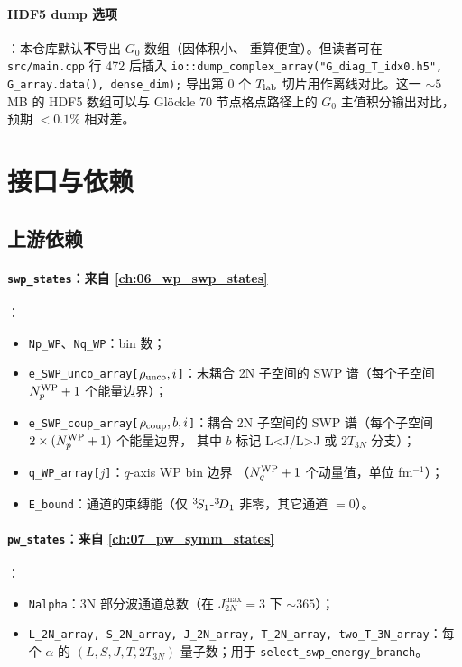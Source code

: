 \paragraph{HDF5 dump 选项}：本仓库默认\textbf{不}导出 \(G_0\) 数组（因体积小、
重算便宜）。但读者可在 \texttt{src/main.cpp} 行 472 后插入
\texttt{io::dump\_complex\_array("G\_diag\_T\_idx0.h5", G\_array.data(),
dense\_dim);} 导出第 0 个 \(T_{\rm lab}\) 切片用作离线对比。这一 \(\sim 5\) MB
的 HDF5 数组可以与 Glöckle 70 节点格点路径上的 \(G_0\) 主值积分输出对比，
预期 \(< 0.1\%\) 相对差。

\section{接口与依赖}
\label{sec:ch10-interface}

\subsection{上游依赖}
\label{subsec:ch10-upstream}

\paragraph{\texttt{swp\_states}：来自 \cref{ch:06_wp_swp_states}}：
\begin{itemize}
  \item \texttt{Np\_WP}、\texttt{Nq\_WP}：bin 数；
  \item \texttt{e\_SWP\_unco\_array[}\(\rho_{\rm unco}, i\)\texttt{]}：未耦合
        2N 子空间的 SWP 谱（每个子空间 \({N_{p}^{\text{WP}}}+1\) 个能量边界）；
  \item \texttt{e\_SWP\_coup\_array[}\(\rho_{\rm coup}, b, i\)\texttt{]}：耦合
        2N 子空间的 SWP 谱（每个子空间 \(2 \times ({N_{p}^{\text{WP}}}+1)\) 个能量边界，
        其中 \(b\) 标记 L<J/L>J 或 \(2T_{3N}\) 分支）；
  \item \texttt{q\_WP\_array[}\(j\)\texttt{]}：\(q\)-axis WP bin 边界
        （\({N_{q}^{\text{WP}}} + 1\) 个动量值，单位 fm\(^{-1}\)）；
  \item \texttt{E\_bound}：通道的束缚能（仅
        \({}^{3}\!S_{1}\)-\({}^{3}\!D_{1}\) 非零，其它通道
        \(=0\)）。
\end{itemize}

\paragraph{\texttt{pw\_states}：来自 \cref{ch:07_pw_symm_states}}：
\begin{itemize}
  \item \texttt{Nalpha}：3N 部分波通道总数（在 \(J_{2N}^{\max}=3\) 下
        \(\sim 365\)）；
  \item \texttt{L\_2N\_array, S\_2N\_array, J\_2N\_array, T\_2N\_array,
        two\_T\_3N\_array}：每个 \(\alpha\) 的 \((L, S, J, T, 2T_{3N})\)
        量子数；用于 \texttt{select\_swp\_energy\_branch}。
\end{itemize}

